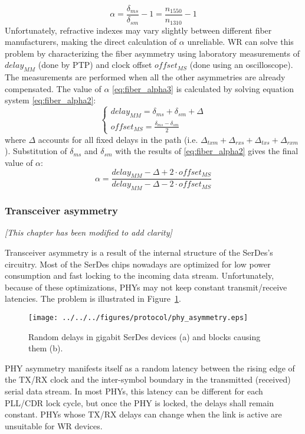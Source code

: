 \begin{equation}
\label{eq:fiber_alpha1}
\alpha = \frac{\delta_{ms}}{\delta_{sm}} - 1 = \frac{n_{1550}}{n_{1310}} - 1
\end{equation}
Unfortunately, refractive indexes may vary slightly between different fiber
manufacturers, making the direct calculation of $\alpha$ unreliable. WR
can solve this problem by characterizing the fiber asymmetry using
laboratory measurements of $delay_{MM}$ (done by PTP) and clock offset
$offset_{MS}$ (done using an oscilloscope). The measurements are performed
when all the other asymmetries are already compensated. The value of
$\alpha$ \ref{eq:fiber_alpha3} is calculated by solving equation system
\ref{eq:fiber_alpha2}:
\begin{equation}
\label{eq:fiber_alpha2}
\begin{cases}
delay_{MM} = \delta_{ms} + \delta_{sm} + \Delta \\
offset_{MS} = \frac{\delta_{ms} - \delta_{sm}}{2}
\end{cases}
\end{equation}
where $\Delta$ accounts for all fixed delays in the path (i.e. $\Delta_{txm}
+ \Delta_{rxs} + \Delta_{txs} + \Delta_{rxm}$). Substitution of $\delta_{ms}$
and $\delta_{sm}$ with the results of \ref{eq:fiber_alpha2} gives the final
value of $\alpha$:
\begin{equation}
\label{eq:fiber_alpha3}
\alpha = \frac{delay_{MM}  - \Delta + 2\cdot offset_{MS}}{delay_{MM} -
\Delta - 2\cdot offset_{MS}}
\end{equation}

\subsubsection{Transceiver asymmetry}
\label{s:xcvr_asymmetry}
\label{sec:calibForGigbitE}
\textit{[This chapter has been modified to add clarity]}


Transceiver asymmetry is a result of the internal structure of the SerDes's
circuitry. Most of the SerDes chips nowadays are optimized for low power
consumption and fast locking to the incoming data stream. Unfortunately,
because of these optimizations, PHYs may not keep constant transmit/receive
latencies. The problem is illustrated in Figure~\ref{fig:phy_asymmetry}.
\begin{figure}[ht!]
  \centering
  \texttt{[image: ../../../figures/protocol/phy\_asymmetry.eps]}
  \caption{Random delays in gigabit SerDes devices (a) and blocks causing them
  (b).}
  \label{fig:phy_asymmetry}
\end{figure}
PHY asymmetry manifests itself as a random latency between the rising edge of
the TX/RX clock and the inter-symbol boundary in the transmitted (received)
serial data stream. In most PHYs, this latency can be different for each
PLL/CDR lock cycle, but once the PHY is locked, the delays shall remain
constant. PHYs whose TX/RX delays can change when the link is active are
unsuitable for WR devices.

